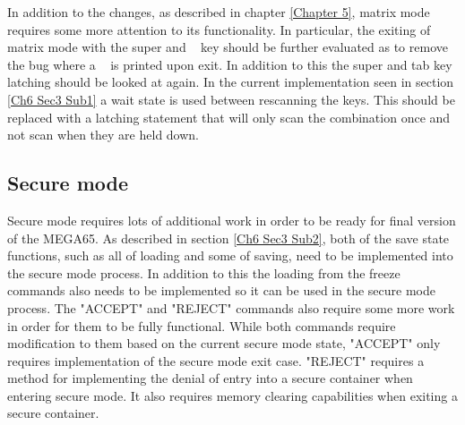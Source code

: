 \label{Ch7 Sec4 Sub1}

In addition to the changes, as described in chapter \ref{Chapter 5}, matrix mode requires some more attention to its functionality. In particular, the exiting of matrix mode with the super and ~ key should be further evaluated as to remove the bug where a ~ is printed upon exit. In addition to this the super and tab key latching should be looked at again. In the current implementation seen in section \ref{Ch6 Sec3 Sub1} a wait state is used between rescanning the keys. This should be replaced with a latching statement that will only scan the combination once and not scan when they are held down.

\subsection{Secure mode}

\label{Ch7 Sec4 Sub2}

Secure mode requires lots of additional work in order to be ready for final version of the MEGA65. As described in section \ref{Ch6 Sec3 Sub2}, both of the save state functions, such as all of loading and some of saving, need to be implemented into the secure mode process. In addition to this the loading from the freeze commands also needs to be implemented so it can be used in the secure mode process. The "ACCEPT" and "REJECT" commands also require some more work in order for them to be fully functional. While both commands require modification to them based on the current secure mode state, "ACCEPT" only requires implementation of the secure mode exit case. "REJECT" requires a method for implementing the denial of entry into a secure container when entering secure mode. It also requires memory clearing capabilities when exiting a secure container.

